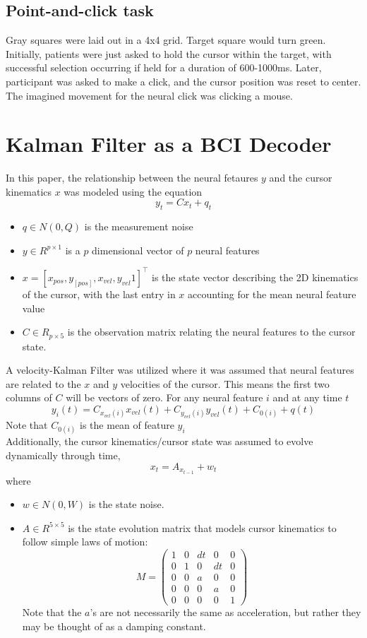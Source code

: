 \documentclass[11pt, a4paper, openany]{report}
\theoremstyle{definition}
\theoremstyle{remark}
\begin{document}
\subsection{Point-and-click task}
Gray squares were laid out in a 4x4 grid. Target square would turn green. Initially, patients were just asked to hold the cursor within the target, with successful selection occurring if held for a duration of 600-1000ms. Later, participant was asked to make a click, and the cursor position was reset to center. The imagined movement for the neural click was clicking a mouse. 

\section{Kalman Filter as a BCI Decoder}
In this paper, the relationship between the neural fetaures \( y \) and the cursor kinematics \( x \) was modeled using the equation
\[ y_t = C x_t + q_t \]
\begin{itemize}
    \item \( q \in  N(0, Q) \) is the measurement noise
    \item \( y \in  R^{p \times 1} \) is a \( p \) dimensional vector of \( p \) neural features
    \item \( x = [x_{pos}, y_[pos], x_{vel}, y_{vel} 1]^{\top} \) is the state vector describing the 2D kinematics of the cursor, with the last entry in \( x \) accounting for the mean neural feature value
    \item \( C \in R_{p \times 5} \) is the observation matrix relating the neural features to the cursor state. 
\end{itemize}

A velocity-Kalman Filter was utilized where it was assumed that neural features are related to the \( x \) and \( y \) velocities of the cursor. This means the first two columns of \( C \) will be vectors of zero. For any neural feature \( i \) and at any time \( t \)
\[ y_i(t) = C_{x_{vel}(i)} x_{vel}(t) + C_{y_{vel}(i)}y_{vel}(t) + C_{0(i)} + q(t) \]
Note that \( C_{0(i)} \) is the mean of feature \( y_i \)\\

Additionally, the cursor kinematics/cursor state was assumed to evolve dynamically through time,
\[ x_t = A_{x_{t-1}} + w_t \]
where 
\begin{itemize}
    \item \( w \in  N(0, W) \) is the state noise. 
    \item \( A \in  R^{5 \times 5} \) is the state evolution matrix that models cursor kinematics to follow simple laws of motion:
    \[ M = \begin{pmatrix}
    1 & 0 & dt & 0 & 0\\
    0 & 1 & 0 & dt & 0\\
    0 & 0 & a & 0 & 0\\
    0 & 0 & 0 & a & 0\\
    0 & 0 & 0 & 0 & 1
    \end{pmatrix} \] 
    Note that the \( a \)'s are not necessarily the same as acceleration, but rather they may be thought of as a damping constant.
\end{itemize}
\end{document}
